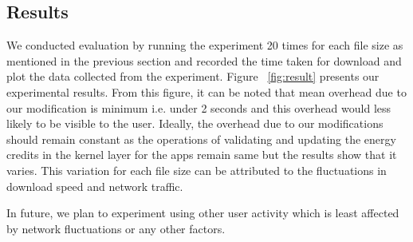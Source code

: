 \subsection{Results}
We conducted  evaluation by running the experiment 20 times for each file size as mentioned in the previous section and recorded the time taken for download and plot the data collected from the experiment. Figure ~\ref{fig:result} presents our experimental results. From this figure, it can be noted that mean overhead due to our modification is minimum i.e. under 2 seconds and this overhead would less likely to be visible to the user. Ideally, the overhead due to our modifications should remain constant as the operations of validating and updating the energy credits in the kernel layer for the apps remain same but the results show that it varies. This variation for each file size can be attributed to the fluctuations in download speed and network traffic.

In future, we plan to experiment using other user activity which is least affected by network fluctuations or any other factors.



